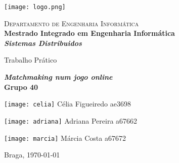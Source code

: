 \begin{titlepage}


\begin{minipage}{0.3\textwidth}
\begin{flushleft} 
\texttt{[image: logo.png]}
\end{flushleft}
\end{minipage}
\begin{minipage}{0.6\textwidth}
\begin{flushright} 

\textsc{Departamento de Engenharia Informática}\\[0.1cm]
\bfseries Mestrado Integrado em Engenharia Informática \\ [0.1cm]
\bfseries \textit{Sistemas Distribuidos}\\[8mm]

\end{flushright}
\end{minipage}


\vspace{3cm}


\begin{center}


\LARGE Trabalho Prático

\vspace{1cm}
\Large \textbf{\textit{Matchmaking num jogo online}}\\[1.5cm]


{\Large \bfseries Grupo 40 \\[2cm] }


\noindent\begin{minipage}[b]{.2\textwidth}
	\texttt{[image: celia]}
	\small{Célia Figueiredo ae3698}
\end{minipage} 
\hfill
\begin{minipage}[b]{.2\textwidth}
	\texttt{[image: adriana]}
	\small{Adriana Pereira a67662}
\end{minipage}
\hfill
\begin{minipage}[b]{.2\textwidth}
	\texttt{[image: marcia]}
	\small{Márcia Costa a67672}
\end{minipage}




\vspace{3ex}


\vfill

\large Braga, {\large \today}

\end{center}
\end{titlepage}
